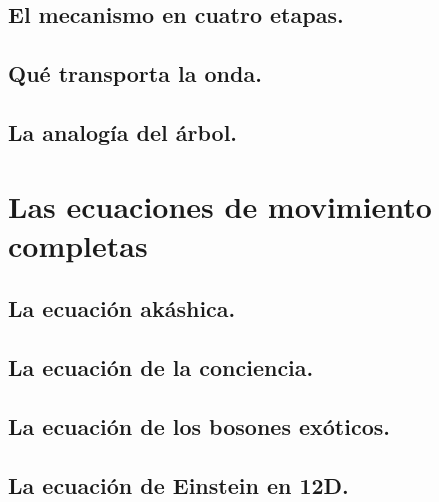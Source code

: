 \subsection{El mecanismo en cuatro etapas.}
\subsection{Qué transporta la onda.}
\subsection{La analogía del árbol.}

\section{Las ecuaciones de movimiento completas}
\subsection{La ecuación akáshica.}
\subsection{La ecuación de la conciencia.}
\subsection{La ecuación de los bosones exóticos.}
\subsection{La ecuación de Einstein en 12D.}

\newpage

